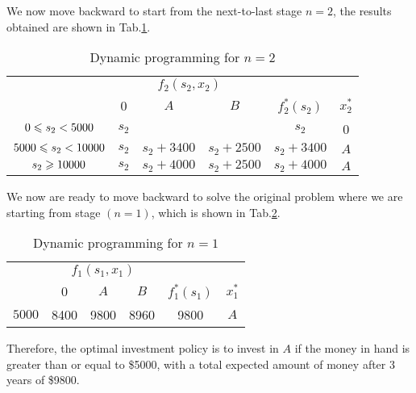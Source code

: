 \documentclass[a4paper]{article}
\begin{document}
\begin{enumerate}
\begin{solution}
	We now move backward to start from the next-to-last stage $n=2$, the results obtained are shown in Tab.\ref{tab32}.
	\begin{table}[H]
	  	\centering
	  	\caption{Dynamic programming for $n=2$}
	  	\label{tab32}
	  	\begin{tabular}{cccccc}
	  		\toprule[1.5pt]
	  		&\multicolumn{3}{c}{$f_2(s_2,x_2)$}&\\
	  		\cmidrule{2-4}
	  		\diagbox[width=9em]{$s_2$}{$x_2$}&\hspace*{0.4cm}0\hspace*{0.4cm}&\hspace*{0.4cm}$A$\hspace*{0.4cm}&\hspace*{0.4cm}$B$\hspace*{0.4cm}&$f_2^*(s_2)$&$x_2^*$\\
	  		\midrule
			$0\leqslant s_2<5000$&$s_2$&&&$s_2$&0\\
			$5000\leqslant s_2<10000$&$s_2$&$s_2+3400$&$s_2+2500$&$s_2+3400$&$A$\\
			$ s_2\geqslant10000$&$s_2$&$s_2+4000$&$s_2+2500$&$s_2+4000$&$A$\\
	  		\bottomrule[1.5pt]
	  	\end{tabular}
  	\end{table}
	We now are ready to move backward to solve the original problem where we are starting from stage $(n=1)$, which is shown in Tab.\ref{tab31}.
	\begin{table}[H]
	  	\centering
	  	\caption{Dynamic programming for $n=1$}
	  	\label{tab31}
	  	\begin{tabular}{cccccc}
	  		\toprule[1.5pt]
	  		&\multicolumn{3}{c}{$f_1(s_1,x_1)$}&\\
	  		\cmidrule{2-4}
	  		\diagbox[width=5em]{$s_1$}{$x_1$}&\hspace*{0.4cm}0\hspace*{0.4cm}&\hspace*{0.4cm}$A$\hspace*{0.4cm}&\hspace*{0.4cm}$B$\hspace*{0.4cm}&$f_1^*(s_1)$&$x_1^*$\\
	  		\midrule
			$5000$&8400&9800&8960&9800&$A$\\
	  		\bottomrule[1.5pt]
	  	\end{tabular}
  	\end{table}
  	
  	Therefore, the optimal investment policy is to invest in $A$ if the money in hand is greater than or equal to \$5000, with a total expected amount of money after 3 years of \$9800.
\end{solution}

\end{enumerate}
%  

%  
  
\end{document}
